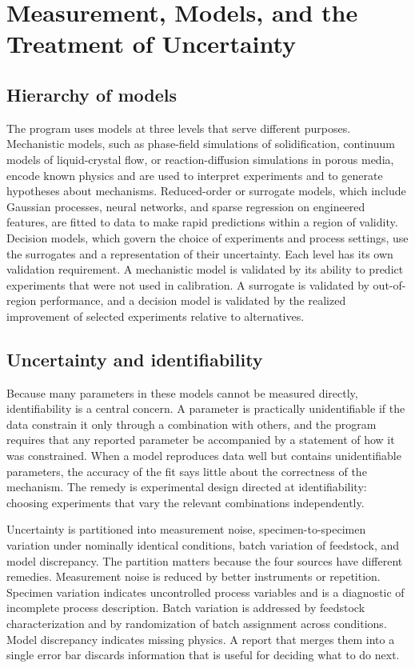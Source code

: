 \documentclass[11pt]{article}
\theoremstyle{definition}
\begin{document}
\section{Measurement, Models, and the Treatment of Uncertainty}

\subsection{Hierarchy of models}

The program uses models at three levels that serve different purposes. Mechanistic models, such as phase-field simulations of solidification, continuum models of liquid-crystal flow, or reaction-diffusion simulations in porous media, encode known physics and are used to interpret experiments and to generate hypotheses about mechanisms. Reduced-order or surrogate models, which include Gaussian processes, neural networks, and sparse regression on engineered features, are fitted to data to make rapid predictions within a region of validity. Decision models, which govern the choice of experiments and process settings, use the surrogates and a representation of their uncertainty. Each level has its own validation requirement. A mechanistic model is validated by its ability to predict experiments that were not used in calibration. A surrogate is validated by out-of-region performance, and a decision model is validated by the realized improvement of selected experiments relative to alternatives.

\subsection{Uncertainty and identifiability}

Because many parameters in these models cannot be measured directly, identifiability is a central concern. A parameter is practically unidentifiable if the data constrain it only through a combination with others, and the program requires that any reported parameter be accompanied by a statement of how it was constrained. When a model reproduces data well but contains unidentifiable parameters, the accuracy of the fit says little about the correctness of the mechanism. The remedy is experimental design directed at identifiability: choosing experiments that vary the relevant combinations independently.

Uncertainty is partitioned into measurement noise, specimen-to-specimen variation under nominally identical conditions, batch variation of feedstock, and model discrepancy. The partition matters because the four sources have different remedies. Measurement noise is reduced by better instruments or repetition. Specimen variation indicates uncontrolled process variables and is a diagnostic of incomplete process description. Batch variation is addressed by feedstock characterization and by randomization of batch assignment across conditions. Model discrepancy indicates missing physics. A report that merges them into a single error bar discards information that is useful for deciding what to do next.
\end{document}
